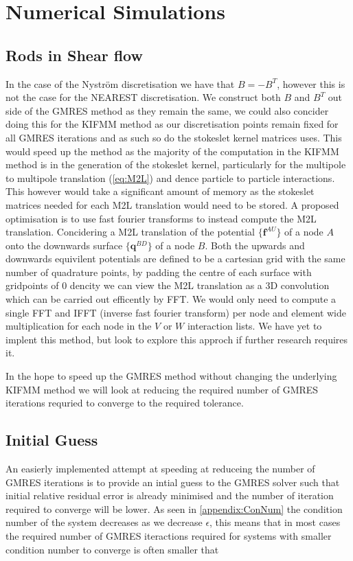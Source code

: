 \section{Numerical Simulations}
\subsection{Rods in Shear flow}

In the case of the Nyström discretisation we have that $B = -B^T$, however this is not the case for the NEAREST discretisation. We construct both $B$ and $B^T$ out side of the GMRES method as they remain the same, we could also concider doing this for the KIFMM method as our discretisation points remain fixed for all GMRES iterations and as such so do the stokeslet kernel matrices uses. This would speed up the method as the majority of the computation in the KIFMM method is in the generation of the stokeslet kernel, particularly for the multipole to multipole translation (\cref{eq:M2L}) and dence particle to particle interactions. This however would take a significant amount of memory as the stokeslet matrices needed for each M2L translation would need to be stored. A proposed optimisation is to use fast fourier transforms to instead compute the M2L translation. Concidering a M2L translation of the potential $\{\bm{f}^{AU}\}$ of a node $A$ onto the downwards surface $\{\bm{q}^{BD}\}$ of a node $B$. Both the upwards and downwards equivilent potentials are defined to be a cartesian grid with the same number of quadrature points, by padding the centre of each surface with gridpoints of $0$ dencity we can view the M2L translation as a 3D convolution \cite{Ying2004} which can be carried out efficently by FFT. We would only need to compute a single FFT and IFFT (inverse fast fourier transform) per node and element wide multiplication for each node in the $V$ or $W$ interaction lists. We have yet to implent this method, but look to explore this approch if further research requires it.

In the hope to speed up the GMRES method without changing the underlying KIFMM method we will look at reducing the required number of GMRES iterations requried to converge to the required tolerance.

\subsection{Initial Guess}\label{sec:Guess}

An easierly implemented attempt at speeding at reduceing the number of GMRES iterations is to provide an intial guess to the GMRES solver such that initial relative residual error is already minimised and the number of iteration required to converge will be lower. As seen in \cref{appendix:ConNum} the condition number of the system decreases as we decrease $\epsilon$, this means that in most cases the required number of GMRES iteractions required for systems with smaller condition number to converge is often smaller that

